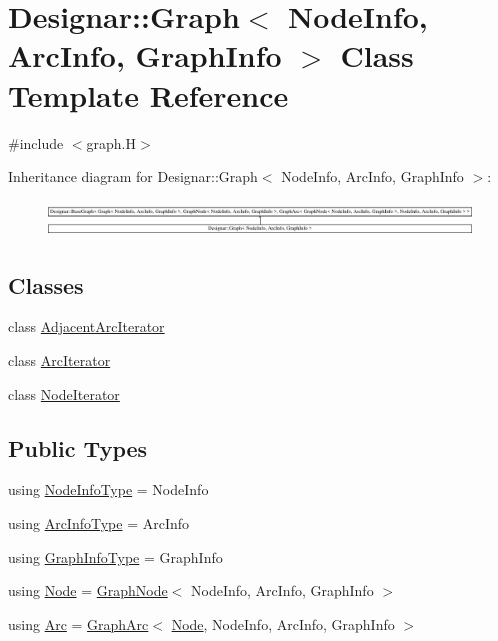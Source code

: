 \hypertarget{class_designar_1_1_graph}{}\section{Designar\+:\+:Graph$<$ Node\+Info, Arc\+Info, Graph\+Info $>$ Class Template Reference}
\label{class_designar_1_1_graph}


{\ttfamily \#include $<$graph.\+H$>$}

Inheritance diagram for Designar\+:\+:Graph$<$ Node\+Info, Arc\+Info, Graph\+Info $>$\+:\begin{figure}[H]
\begin{center}
\leavevmode
\includegraphics[height=0.952381cm]{class_designar_1_1_graph}
\end{center}
\end{figure}
\subsection*{Classes}
\begin{DoxyCompactItemize}
\item 
class \hyperlink{class_designar_1_1_graph_1_1_adjacent_arc_iterator}{Adjacent\+Arc\+Iterator}
\item 
class \hyperlink{class_designar_1_1_graph_1_1_arc_iterator}{Arc\+Iterator}
\item 
class \hyperlink{class_designar_1_1_graph_1_1_node_iterator}{Node\+Iterator}
\end{DoxyCompactItemize}
\subsection*{Public Types}
\begin{DoxyCompactItemize}
\item 
using \hyperlink{class_designar_1_1_graph_a31ac58ee9562d1695e63449318577032}{Node\+Info\+Type} = Node\+Info
\item 
using \hyperlink{class_designar_1_1_graph_abc2adb4841a6d092d5093f9e60f2c8be}{Arc\+Info\+Type} = Arc\+Info
\item 
using \hyperlink{class_designar_1_1_graph_a5b6ad505f3b0f5a5cd288a13bebf2d27}{Graph\+Info\+Type} = Graph\+Info
\item 
using \hyperlink{class_designar_1_1_graph_a5dfc7dba9d092ac489c72e40390c37d0}{Node} = \hyperlink{class_designar_1_1_graph_node}{Graph\+Node}$<$ Node\+Info, Arc\+Info, Graph\+Info $>$
\item 
using \hyperlink{class_designar_1_1_graph_a74c730ef4ce2d20f998d72bd25c2b5bf}{Arc} = \hyperlink{class_designar_1_1_graph_arc}{Graph\+Arc}$<$ \hyperlink{class_designar_1_1_graph_a5dfc7dba9d092ac489c72e40390c37d0}{Node}, Node\+Info, Arc\+Info, Graph\+Info $>$
\end{DoxyCompactItemize}
